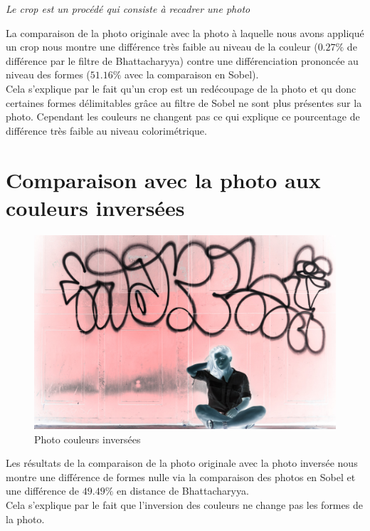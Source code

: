 \documentclass[]{article}
\begin{document}
\emph{Le crop est un procédé qui consiste à recadrer une photo}

La comparaison de la photo originale avec la photo à laquelle nous avons
appliqué un crop nous montre une différence très faible au niveau de la
couleur ($0.27\%$ de différence par le filtre de Bhattacharyya) contre
une différenciation prononcée au niveau des formes ($51.16\%$ avec la
comparaison en Sobel). \\
Cela s'explique par le fait qu'un crop est un redécoupage de la photo et qu
donc certaines formes délimitables grâce au filtre de Sobel ne sont plus
présentes sur la photo. Cependant les couleurs ne changent pas ce qui explique
ce pourcentage de différence très faible au niveau colorimétrique.

\newpage

\section{Comparaison avec la photo aux couleurs
inversées}\label{comparaison-avec-la-photo-aux-couleurs-inversuxe9es}

\begin{figure}[htbp]
\centering
\includegraphics{photos/inverse.jpg}
\caption{Photo couleurs inversées}
\end{figure}

Les résultats de la comparaison de la photo originale avec la photo
inversée nous montre une différence de formes nulle via la comparaison
des photos en Sobel et une différence de $49.49\%$ en distance de
Bhattacharyya. \\ 
Cela s'explique par le fait que l'inversion des couleurs ne change pas les
formes de la photo.
\end{document}
